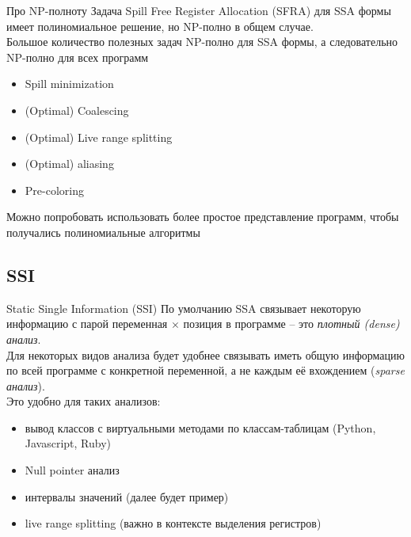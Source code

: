 \documentclass[aspectratio=169
  , xcolor={svgnames}
  , hyperref={ colorlinks,citecolor=DeepPink4
             , linkcolor=DarkRed,urlcolor=DarkBlue}
  , russian
  ]{beamer}
\theoremstyle{exerciseStyle1}
\begin{document}
\begin{frame}[fragile]{Про NP-полноту}
Задача Spill Free Register Allocation (SFRA) для SSA формы имеет полиномиальное решение, но NP-полно в общем случае.\\


Большое количество полезных задач NP-полно для SSA формы, а следовательно NP-полно для всех программ
\begin{itemize}
\item Spill minimization
\item (Optimal) Coalescing
\item (Optimal) Live range splitting 
\item (Optimal) aliasing
\item Pre-coloring
\end{itemize}
Можно попробовать использовать более простое представление программ, чтобы получались полиномиальные алгоритмы
\end{frame}

\subsection{SSI}

\begin{frame}[fragile]{Static Single Information (SSI)}
По умолчанию SSA связывает некоторую информацию с парой переменная $\times$ позиция в программе -- это \emph{плотный (dense) анализ}.\\

Для некоторых видов анализа будет удобнее связывать иметь общую информацию по всей программе с конкретной переменной, а не каждым её вхождением (\emph{sparse анализ}). \\

Это удобно для таких анализов:
\begin{itemize}
\item вывод классов с виртуальными методами по классам-таблицам (Python, Javascript, Ruby) %
\item Null pointer анализ
\item интервалы значений (далее будет пример)
\item live range splitting (важно в контексте выделения регистров)
\end{itemize}
\end{frame}
\end{document}
